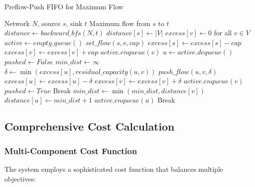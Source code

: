 \documentclass[12pt,a4paper]{article}
\begin{document}
\begin{algorithm}
\caption{Preflow-Push FIFO for Maximum Flow}
\begin{algorithmic}[1]
\REQUIRE Network $N$, source $s$, sink $t$
\ENSURE Maximum flow from $s$ to $t$
\STATE $distance \leftarrow backward\_bfs(N, t)$
\STATE $distance[s] \leftarrow |V|$
\STATE $excess[v] \leftarrow 0$ for all $v \in V$
\STATE $active \leftarrow empty\_queue()$
    \STATE $set\_flow(s,v, cap)$
    \STATE $excess[s] \leftarrow excess[s] - cap$
    \STATE $excess[v] \leftarrow excess[v] + cap$
        \STATE $active.enqueue(v)$
    \ENDIF
\ENDFOR
{}
    \STATE $u \leftarrow active.dequeue()$
        \STATE $pushed \leftarrow False$
        \STATE $min\_dist \leftarrow \infty$
                \STATE $\delta \leftarrow \min(excess[u], residual\_capacity(u,v))$
                \STATE $push\_flow(u, v, \delta)$
                \STATE $excess[u] \leftarrow excess[u] - \delta$
                \STATE $excess[v] \leftarrow excess[v] + \delta$
                    \STATE $active.enqueue(v)$
                \ENDIF
                \STATE $pushed \leftarrow True$
                \STATE Break
            \ENDIF
            \STATE $min\_dist \leftarrow \min(min\_dist, distance[v])$
        \ENDFOR
            \STATE $distance[u] \leftarrow min\_dist + 1$
            \STATE $active.enqueue(u)$
            \STATE Break
        \ENDIF
    \ENDWHILE
\ENDWHILE
\end{algorithmic}
\end{algorithm}

\subsection{Comprehensive Cost Calculation}

\subsubsection{Multi-Component Cost Function}

The system employs a sophisticated cost function that balances multiple objectives:
\end{document}
